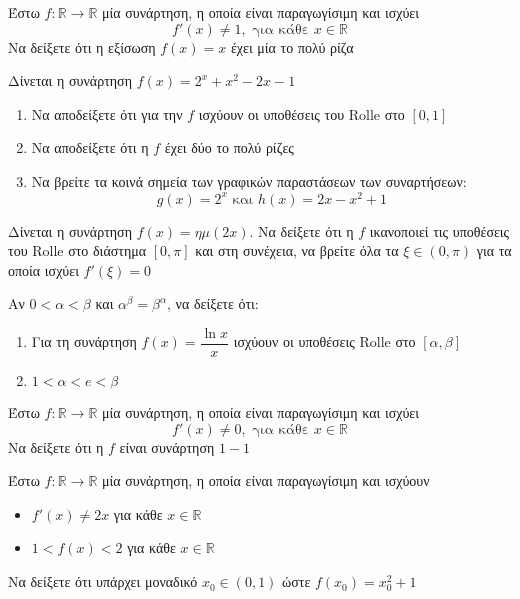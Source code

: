 \documentclass{presentation}
\begin{document}
\begin{askisi}
    Έστω $f:\mathbb{R}\to\mathbb{R}$ μία συνάρτηση, η οποία είναι παραγωγίσιμη και ισχύει
    $$f'(x)\ne 1, \text{ για κάθε } x\in\mathbb{R}$$
    Να δείξετε ότι η εξίσωση $f(x)=x$ έχει μία το πολύ ρίζα
\end{askisi}

\begin{askisi}
    Δίνεται η συνάρτηση $f(x)=2^x+x^2-2x-1$
    \begin{enumerate}
        \item<1-> Να αποδείξετε ότι για την $f$ ισχύουν οι υποθέσεις του Rolle στο $[0,1]$
        \item<2-> Να αποδείξετε ότι η $f$ έχει δύο το πολύ ρίζες
        \item<3-> Να βρείτε τα κοινά σημεία των γραφικών παραστάσεων των συναρτήσεων:
            $$g(x)=2^x \text{ και } h(x)=2x-x^2+1$$
    \end{enumerate}
\end{askisi}

\begin{askisi}
    Δίνεται η συνάρτηση $f(x)=ημ(2x)$. Να δείξετε ότι η $f$ ικανοποιεί τις υποθέσεις του Rolle στο διάστημα $[0,π]$ και στη συνέχεια, να βρείτε όλα τα $ξ\in (0,π)$ για τα οποία ισχύει $f'(ξ)=0$
\end{askisi}

\begin{askisi}
    Αν $0<α<β$ και $α^β=β^α$, να δείξετε ότι:
    \begin{enumerate}
        \item<1-> Για τη συνάρτηση $f(x)=\dfrac{\ln x}{x}$ ισχύουν οι υποθέσεις Rolle στο $[α,β]$
        \item<2-> $1<α<e<β$
    \end{enumerate}
\end{askisi}

\begin{askisi}
    Έστω $f:\mathbb{R}\to\mathbb{R}$ μία συνάρτηση, η οποία είναι παραγωγίσιμη και ισχύει
    $$f'(x)\ne 0, \text{ για κάθε } x\in\mathbb{R}$$
    Να δείξετε ότι η $f$ είναι συνάρτηση $1-1$
\end{askisi}

\begin{askisi}
    Έστω $f:\mathbb{R}\to\mathbb{R}$ μία συνάρτηση, η οποία είναι παραγωγίσιμη και ισχύουν
    \begin{itemize}
        \item $f'(x)\ne 2x$ για κάθε $x\in\mathbb{R}$
        \item $1<f(x)<2$ για κάθε $x\in\mathbb{R}$
    \end{itemize}
    Να δείξετε ότι υπάρχει μοναδικό $x_0\in (0,1)$ ώστε $f(x_0)=x_0^2+1$
\end{askisi}
\end{document}
